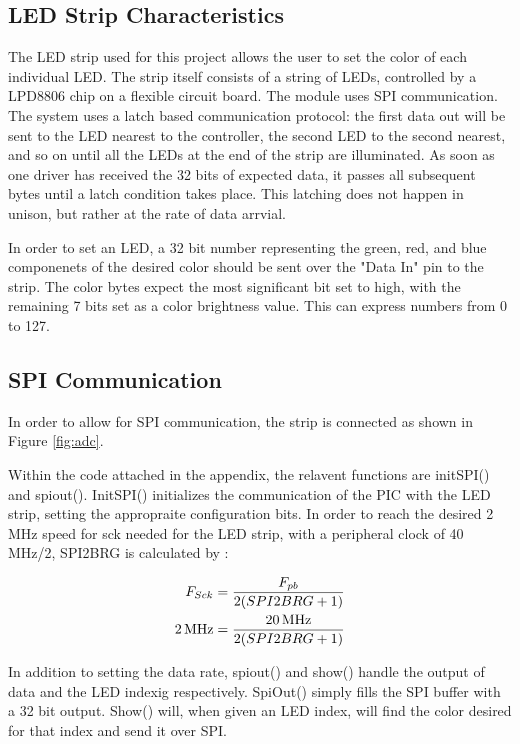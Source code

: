 \documentclass[11pt]{article}
\begin{document}
\subsection{LED Strip Characteristics}
The LED strip used for this project allows the user to set the color of each individual LED. The strip itself consists of a string of LEDs, controlled by a LPD8806 chip on a flexible circuit board. The module uses SPI communication. The system uses a latch based communication protocol: the first data out will be sent to the LED nearest to the controller, the second LED to the second nearest, and so on until all the LEDs at the end of the strip are illuminated. As soon as one driver has received the 32 bits of expected data, it passes all subsequent bytes until a latch condition takes place. This latching does not happen in unison, but  rather at the rate of data arrvial. 

In order to set an LED, a 32 bit number representing the green, red, and blue componenets of the desired color should be sent over the "Data In" pin to the strip. The color bytes expect the most significant bit set to high, with the remaining 7 bits set as a color brightness value. This can express numbers from 0 to 127.

\subsection{SPI Communication}
In order to allow for SPI communication, the strip is connected as shown in Figure \ref{fig:adc}.

Within the code attached in the appendix, the relavent functions are initSPI() and spiout(). InitSPI() initializes the communication of the PIC with the LED strip, setting the appropraite configuration bits. In order to reach the desired 2 MHz speed for sck needed for the LED strip, with a peripheral clock of 40 MHz/2, SPI2BRG is calculated by \cite{Section23SPI}:

\begin{align*}
F_{Sck} = \frac{F_{pb}}{2(SPI2BRG +1 )} \\
\unit[2]{MHz} = \frac{\unit[20]{MHz}}{2(SPI2BRG +1 )}
\end{align*}

In addition to setting the data rate, spiout() and show() handle the output of data and the LED indexig respectively. SpiOut() simply fills the SPI buffer with a 32 bit output. Show() will, when given an LED index, will find the color desired for that index and send it over SPI. 
\end{document}
